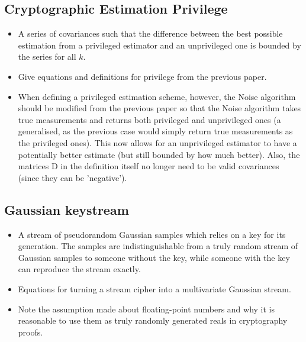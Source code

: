 \documentclass[conference]{IEEEtran}
\begin{document}
\subsection{Cryptographic Estimation Privilege}
\begin{itemize}
  \item A series of covariances such that the difference between the best possible estimation from a privileged estimator and an unprivileged one is bounded by the series for all $k$.
  \item Give equations and definitions for privilege from the previous paper.
  \item When defining a privileged estimation scheme, however, the Noise algorithm should be modified from the previous paper so that the Noise algorithm takes true measurements and returns both privileged and unprivileged ones (a generalised, as the previous case would simply return true measurements as the privileged ones). This now allows for an unprivileged estimator to have a potentially better estimate (but still bounded by how much better). Also, the matrices D in the definition itself no longer need to be valid covariances (since they can be 'negative').
\end{itemize}
\subsection{Gaussian keystream}
\begin{itemize}
  \item A stream of pseudorandom Gaussian samples which relies on a key for its generation. The samples are indistinguishable from a truly random stream of Gaussian samples to someone without the key, while someone with the key can reproduce the stream exactly.
  \item Equations for turning a stream cipher into a multivariate Gaussian stream.
  \item Note the assumption made about floating-point numbers and why it is reasonable to use them as truly randomly generated reals in cryptography proofs.
\end{itemize}
\end{document}
